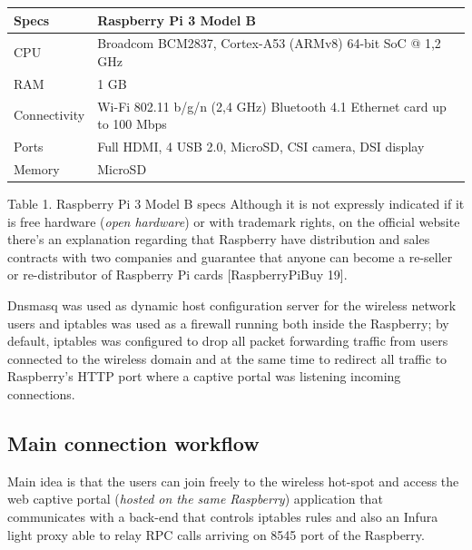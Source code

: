 \documentclass[12pt]{amsart}
\begin{document}
\begin{multicols}{2}
\begin{center}
\vspace{0.35cm}

\begin{tabular}{ | m{} | m{} | }
 \hline
 Specs & Raspberry Pi 3 Model B \\
 \hline
 CPU & Broadcom BCM2837, Cortex-A53 (ARMv8) 64-bit SoC @ 1,2 GHz \\
\hline
 RAM & 1 GB \\
\hline
 Connectivity & Wi-Fi 802.11 b/g/n (2,4 GHz) Bluetooth 4.1 Ethernet card up to 100 Mbps \\
\hline
 Ports & Full HDMI, 4 USB 2.0, MicroSD, CSI camera, DSI display \\
\hline
 Memory & MicroSD \\
\hline
\end{tabular}
\end{center}
\vspace{0.15cm}
Table 1. Raspberry Pi 3 Model B specs
Although it is not expressly indicated if it is free hardware
(\textit{open hardware}) or with trademark rights, on the
official website there's an explanation regarding
that Raspberry have distribution and sales contracts with
two companies and guarantee that anyone can become a re-seller or
re-distributor of Raspberry Pi cards [RaspberryPiBuy 19].

\vspace{0.35cm}

Dnsmasq\cite{dnsmasq} was used
as dynamic host configuration server for the wireless
network users and
iptables\cite{iptables} was used as a firewall running
both inside the Raspberry; by default, iptables
was configured to
drop all packet
forwarding traffic from users connected to the wireless
domain and at the same time to redirect all
traffic to Raspberry's HTTP port where a
captive portal was listening incoming connections.


\subsection{Main connection workflow}

\vspace{0.35cm}

Main idea is that the users can join freely
to the wireless hot-spot and access the web captive portal
(\textit{hosted on the same Raspberry}) application that
communicates with a back-end that controls iptables
rules and also an Infura light proxy able to relay RPC
calls arriving on 8545 port of the Raspberry.


\end{multicols}
\end{document}
